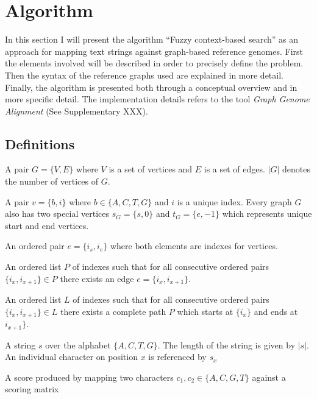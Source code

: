 \documentclass{article}
\begin{document}
\chapter{Algorithm}
In this section I will present the algorithm ``Fuzzy context-based search'' as an approach for mapping text strings against graph-based reference genomes. First the elements involved will be described in order to precisely define the problem. Then the syntax of the reference graphs used are explained in more detail. Finally, the algorithm is presented both through a conceptual overview and in more specific detail. The implementation details refers to the tool \textit{Graph Genome Alignment} (See Supplementary XXX).
\section{Definitions}
\begin{defn}
  A pair $G=\{V,E\}$ where $V$ is a set of vertices and $E$ is a set of edges. $|G|$ denotes the number of vertices of $G$.
\end{defn}
\begin{defn}[Vertice]
  A pair $v=\{b, i\}$ where $b \in \{A, C, T, G\}$ and $i$ is a unique index. Every graph $G$ also has two special vertices $s_G=\{s, 0\}$ and $t_G=\{e, -1\}$ which represents unique start and end vertices.
\end{defn}
\begin{defn}[Edge]
  An ordered pair $e=\{i_s, i_e\}$ where both elements are indexes for vertices. 
\end{defn}
\begin{defn}
  An ordered list $P$ of indexes such that for all consecutive ordered pairs $\{i_x, i_{x+1}\} \in P$ there exists an edge $e=\{i_x, i_{x+1}\}$.
\end{defn}
\begin{defn}[Path]
  An ordered list $L$ of indexes such that for all consecutive ordered pairs $\{i_x, i_{x+1}\} \in L$ there exists a complete path $P$ which starts at $\{i_x\}$ and ends at $i_{x+1}\}$.
\end{defn}
\begin{defn}
  A string $s$ over the alphabet $\{A, C, T, G\}$. The length of the string is given by $|s|$. An individual character on position $x$ is referenced by $s_x$
\end{defn}
\begin{defn}
  A score produced by mapping two characters $c_1, c_2 \in \{A, C, G, T\}$ against a scoring matrix
\end{defn}
\end{document}
